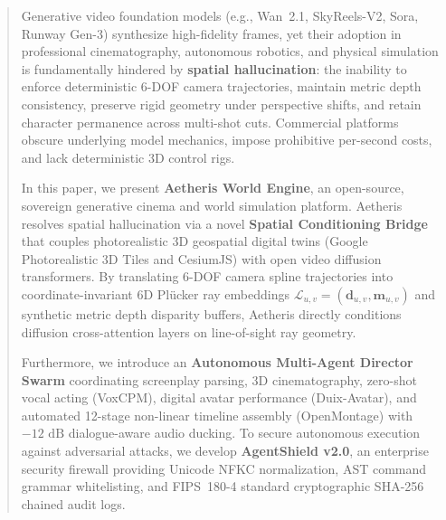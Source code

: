 \documentclass[10pt,twocolumn,letterpaper]{article}
\begin{document}
\begin{abstract}
Generative video foundation models (e.g., Wan~2.1, SkyReels-V2, Sora, Runway Gen-3) synthesize high-fidelity frames, yet their adoption in professional cinematography, autonomous robotics, and physical simulation is fundamentally hindered by \textbf{spatial hallucination}: the inability to enforce deterministic 6-DOF camera trajectories, maintain metric depth consistency, preserve rigid geometry under perspective shifts, and retain character permanence across multi-shot cuts. Commercial platforms obscure underlying model mechanics, impose prohibitive per-second costs, and lack deterministic 3D control rigs.

In this paper, we present \textbf{Aetheris World Engine}, an open-source, sovereign generative cinema and world simulation platform. Aetheris resolves spatial hallucination via a novel \textbf{Spatial Conditioning Bridge} that couples photorealistic 3D geospatial digital twins (Google Photorealistic 3D Tiles and CesiumJS) with open video diffusion transformers. By translating 6-DOF camera spline trajectories into coordinate-invariant 6D Pl\"ucker ray embeddings $\mathcal{L}_{u,v} = (\mathbf{d}_{u,v}, \mathbf{m}_{u,v})$ and synthetic metric depth disparity buffers, Aetheris directly conditions diffusion cross-attention layers on line-of-sight ray geometry. 

Furthermore, we introduce an \textbf{Autonomous Multi-Agent Director Swarm} coordinating screenplay parsing, 3D cinematography, zero-shot vocal acting (VoxCPM), digital avatar performance (Duix-Avatar), and automated 12-stage non-linear timeline assembly (OpenMontage) with $-12\text{ dB}$ dialogue-aware audio ducking. To secure autonomous execution against adversarial attacks, we develop \textbf{AgentShield v2.0}, an enterprise security firewall providing Unicode NFKC normalization, AST command grammar whitelisting, and FIPS~180-4 standard cryptographic SHA-256 chained audit logs.


\end{abstract}
\end{document}
